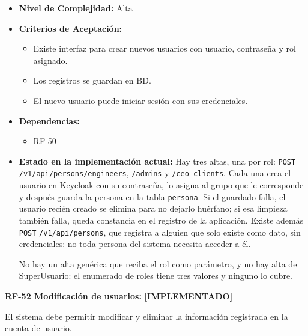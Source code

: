 \documentclass[12pt,a4paper]{article}
\newcommand{\ruta}[1]{\nolinkurl{#1}}
\newcommand{\estadoImplementado}{\textcolor{mainRed}{\textbf{[IMPLEMENTADO]}}}
\begin{document}
\begin{itemize}
  \item \textbf{Nivel de Complejidad:} Alta

  \item \textbf{Criterios de Aceptación:}
  \begin{itemize}
    \item Existe interfaz para crear nuevos usuarios con usuario, contraseña y rol asignado.
    \item Los registros se guardan en BD.
    \item El nuevo usuario puede iniciar sesión con sus credenciales.
  \end{itemize}

  \item \textbf{Dependencias:}
  \begin{itemize}
    \item RF-50
  \end{itemize}

  \item \textbf{Estado en la implementación actual:} Hay tres altas, una por rol: \texttt{POST} \ruta{/v1/api/persons/engineers}, \ruta{/admins} y \ruta{/ceo-clients}. Cada una crea el usuario en Keycloak con su contraseña, lo asigna al grupo que le corresponde y después guarda la persona en la tabla \texttt{persona}. Si el guardado falla, el usuario recién creado se elimina para no dejarlo huérfano; si esa limpieza también falla, queda constancia en el registro de la aplicación. Existe además \texttt{POST} \ruta{/v1/api/persons}, que registra a alguien que solo existe como dato, sin credenciales: no toda persona del sistema necesita acceder a él.

  No hay un alta genérica que reciba el rol como parámetro, y no hay alta de SuperUsuario: el enumerado de roles tiene tres valores y ninguno lo cubre.
\end{itemize}

\textbf{RF-52 Modificación de usuarios:} \estadoImplementado{}

El sistema debe permitir modificar y eliminar la información registrada en la cuenta de usuario.
\end{document}
